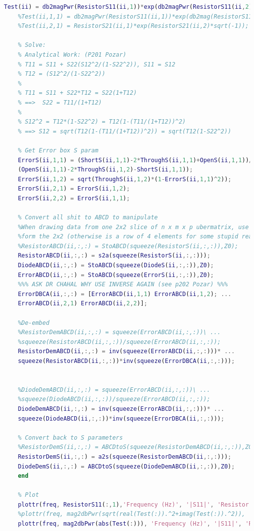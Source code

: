 \documentclass{article} %
\begin{document}
\begin{lstlisting}[language=Matlab, caption=De-embedding MATLAB Code]
	Test(ii) = db2magPwr(ResistorS11(ii,1))*exp(db2magPwr(ResistorS11(ii,2))*sqrt(-1));
	%Test(ii,1,1) = db2magPwr(ResistorS11(ii,1))*exp(db2mag(ResistorS11(ii,2))*sqrt(-1));
	%Test(ii,2,1) = ResistorS21(ii,1)*exp(ResistorS21(ii,2)*sqrt(-1));
	
	% Solve:
	% Analytical Work: (P201 Pozar)
	% T11 = S11 + S22(S12^2/(1-S22^2)), S11 = S12
	% T12 = (S12^2/(1-S22^2))
	%
	% T11 = S11 + S22*T12 = S22(1+T12)  
	% ==>  S22 = T11/(1+T12)
	%
	% S12^2 = T12*(1-S22^2) = T12(1-(T11/(1+T12))^2)
	% ==> S12 = sqrt(T12(1-(T11/(1+T12))^2)) = sqrt(T12(1-S22^2))
	
	% Get Error box S param
	ErrorS(ii,1,1) = (ShortS(ii,1,1)-2*ThroughS(ii,1,1)+OpenS(ii,1,1))/ ...
	(OpenS(ii,1,1)-2*ThroughS(ii,1,2)-ShortS(ii,1,1));
	ErrorS(ii,1,2) = sqrt(ThroughS(ii,1,2)*(1-ErrorS(ii,1,1)^2));
	ErrorS(ii,2,1) = ErrorS(ii,1,2);
	ErrorS(ii,2,2) = ErrorS(ii,1,1);
	
	% Convert all shit to ABCD to manipulate
	%When drawing data from one 2x2 slice of n x m x p ubermatrix, use squeeze to
	%form the 2x2 (otherwise is a row of 4 elements for some stupid reason)
	%ResistorABCD(ii,:,:) = StoABCD(squeeze(ResistorS(ii,:,:)),Z0);
	ResistorABCD(ii,:,:) = s2a(squeeze(ResistorS(ii,:,:)));
	DiodeABCD(ii,:,:) = StoABCD(squeeze(DiodeS(ii,:,:)),Z0);
	ErrorABCD(ii,:,:) = StoABCD(squeeze(ErrorS(ii,:,:)),Z0);
	%%% ASK DR CHAHAL WHY USE INVERSE AGAIN (see p202 Pozar) %%%   
	ErrorDBCA(ii,:,:) = [ErrorABCD(ii,1,1) ErrorABCD(ii,1,2); ...
	ErrorABCD(ii,2,1) ErrorABCD(ii,2,2)];
	
	%De-embed
	%ResistorDemABCD(ii,:,:) = squeeze(ErrorABCD(ii,:,:))\ ...
	%squeeze(ResistorABCD(ii,:,:))/squeeze(ErrorABCD(ii,:,:));
	ResistorDemABCD(ii,:,:) = inv(squeeze(ErrorABCD(ii,:,:)))* ...
	squeeze(ResistorABCD(ii,:,:))*inv(squeeze(ErrorDBCA(ii,:,:)));
	
	
	%DiodeDemABCD(ii,:,:) = squeeze(ErrorABCD(ii,:,:))\ ...
	%squeeze(DiodeABCD(ii,:,:))/squeeze(ErrorABCD(ii,:,:));
	DiodeDemABCD(ii,:,:) = inv(squeeze(ErrorABCD(ii,:,:)))* ...
	squeeze(DiodeABCD(ii,:,:))*inv(squeeze(ErrorDBCA(ii,:,:)));
	
	% Convert back to S parameters
	%ResistorDemS(ii,:,:) = ABCDtoS(squeeze(ResistorDemABCD(ii,:,:)),Z0);
	ResistorDemS(ii,:,:) = a2s(squeeze(ResistorDemABCD(ii,:,:)));
	DiodeDemS(ii,:,:) = ABCDtoS(squeeze(DiodeDemABCD(ii,:,:)),Z0);
	end
	
	% Plot
	plottr(freq, ResistorS11(:,1),'Frequency (Hz)', '|S11|', 'Resistor S11(nonimbed, straight mag from file)')
	%plottr(freq, mag2dbPwr(sqrt(real(Test(:)).^2+imag(Test(:)).^2)), 'Frequency (Hz)', '|S11|', 'Resistor S11(test)')
	plottr(freq, mag2dbPwr(abs(Test(:))), 'Frequency (Hz)', '|S11|', 'Resistor S11(nonimbed, db->mag,mag->db)')
	

\end{lstlisting}
\end{document}
